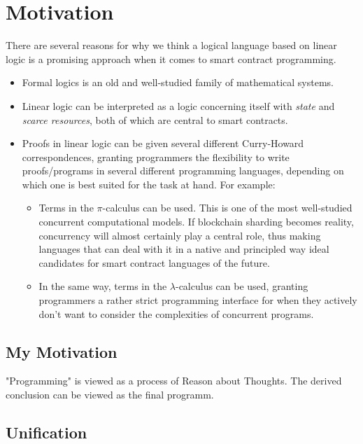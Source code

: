 \documentclass[sigconf]{acmart}
\begin{document}
\section{Motivation}
There are several reasons for why we think a logical language based on linear logic is a promising approach when it comes to smart contract programming.

\begin{itemize}
  \item Formal logics is an old and well-studied family of mathematical systems.
  \item Linear logic can be interpreted as a logic concerning itself with \emph{state} and \emph{scarce resources}, both of which are central to smart contracts.
  \item Proofs in linear logic can be given several different Curry-Howard correspondences, granting programmers the flexibility to write proofs/programs in several different programming languages, depending on which one is best suited for the task at hand. For example:
  \begin{itemize}
  		\item Terms in the $\pi$-calculus can be used. This is one of the most well-studied concurrent computational models. If blockchain sharding becomes reality, concurrency will almost certainly play a central role, thus making languages that can deal with it in a native and principled way ideal candidates for smart contract languages of the future.
  		\item In the same way, terms in the $\lambda$-calculus can be used, granting programmers a rather strict programming interface for when they actively don't want to consider the complexities of concurrent programs.
  \end{itemize}
\end{itemize}

\subsection*{My Motivation}
\TODO{!!!}

"Programming" is viewed as a process of Reason about Thoughts. The derived conclusion can be viewed as the final programm.

\subsection*{Unification}

\end{document}

